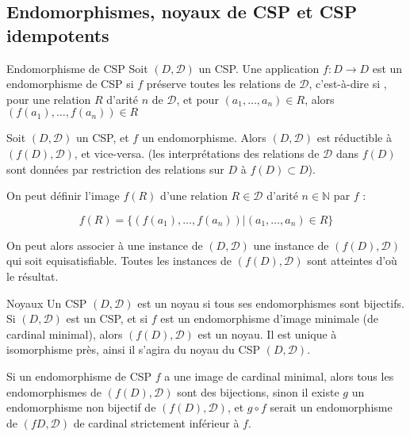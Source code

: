 \subsection{Endomorphismes, noyaux de CSP et CSP idempotents}

\begin{defi}{Endomorphisme de CSP}
Soit $(D,\mathcal{D})$ un CSP. Une application $f : D \rightarrow D$ est un endomorphisme de CSP si $f$ préserve toutes les relations de $\mathcal{D}$, c'est-à-dire si , pour une relation $R$ d'arité $n$ de $\mathcal{D}$, et pour $(a_1,\dots,a_n) \in R$, alors $(f(a_1),\dots,f(a_n)) \in R$
\end{defi}

\begin{prop}
Soit $(D,\mathcal{D})$ un CSP, et $f$ un endomorphisme. Alors $(D,\mathcal{D})$ est réductible à $(f(D),\mathcal{D})$, et vice-versa. (les interprétations des relations de $\mathcal{D}$ dans $f(D)$ sont données par restriction des relations sur $D$ à $f(D) \subset D$).
\end{prop}

\begin{pv}
On peut définir l'image $f(R)$ d'une relation $R \in \mathcal{D}$ d'arité $n \in \mathbb{N}$ par $f$ :

$$ f(R) = \{ (f(a_1),\dots,f(a_n))| (a_1,\dots,a_n) \in R\}$$

On peut alors associer à une instance de $(D,\mathcal{D})$ une instance de $(f(D),\mathcal{D})$ qui soit equisatisfiable. Toutes les instances de $(f(D),\mathcal{D})$ sont atteintes d'où le résultat.
\end{pv}

\begin{defi}{Noyaux}
Un CSP $(D,\mathcal{D})$ est un noyau si tous ses endomorphismes sont bijectifs. Si $(D,\mathcal{D})$ est un CSP, et si $f$ est un endomorphisme d'image minimale (de cardinal minimal), alors $(f(D),\mathcal{D})$ est un noyau. Il est unique à isomorphisme près, ainsi il s'agira du noyau du CSP $(D,\mathcal{D})$.
\end{defi}

\begin{pv}
Si un endomorphisme de CSP $f$ a une image de cardinal minimal, alors tous les endomorphismes de $(f(D),\mathcal{D})$ sont des bijections, sinon il existe $g$ un endomorphisme non bijectif de $(f(D),\mathcal{D})$, et $g \circ f$ serait un endomorphisme de $(fD,\mathcal{D})$ de cardinal strictement inférieur à $f$.
\end{pv}

